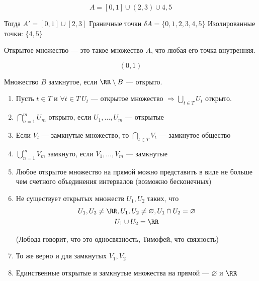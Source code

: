 \begin{example}{}{}
    \[
        A = [0, 1] \cup (2, 3) \cup {4, 5}
    \]

    Тогда \( A' = [0, 1] \cup [2, 3] \)
    Граничные точки \( \delta A = \{ 0, 1, 2, 3, 4, 5 \} \)
    Изолированные точки: \( \{ 4, 5 \} \)
\end{example}

\begin{defn}{}{}
    Открытое множество --- это такое множество \( A \), что любая его точка внутренняя.
\end{defn}

\begin{example}{}{}
    \[ 
        (0, 1)
    \]
\end{example}

\begin{example}{}{}
    Множество \( B \) замкнутое, если \( \RR \setminus B \) --- открыто.
\end{example}

\begin{exercise}{}{}
    \begin{enumerate}
        \item
            Пусть \( t \in T \) и \( \forall t \in T \ U_t \) --- открытое множество 
            \( \displaystyle \Rightarrow \bigcup_{t \in T} U_t \) открыто.
        \item
            \( \displaystyle \bigcap\limits_{n = 1}^m U_m \) открыто, если \( U_1, \ldots, U_m \) --- открытые
        \item
            Если \( V_t \) --- замкнутые множество, то \( \displaystyle \bigcap\limits_{t \in T} V_t \) --- замкнутое общество
        \item
            \( \displaystyle \bigcup\limits_{n = 1}^m V_m \) замкнуто, если \( V_1, \ldots, V_m \) --- замкнутые
        \item
            Любое открытое множество на прямой можно представить в виде не больше чем счетного объединения интервалов
            (возможно бесконечных)
        \item
            Не существует открытых множеств \( U_1, U_2 \) таких, 
            что
            \begin{gather*}
                U_1, U_2 \neq \RR, U_1, U_2 \neq \varnothing, U_1 \cap U_2 = \varnothing
                \\
                U_1 \cup U_2 = \RR
            \end{gather*}

            (Лобода говорит, что это односвязность, Тимофей, что связность)
        \item
            То же верно и для замкнутых \( V_1, V_2 \)
        \item
            Единственные открытые и замкнутые множества на прямой --- \( \varnothing \) и \( \RR \)
    \end{enumerate}
\end{exercise}

